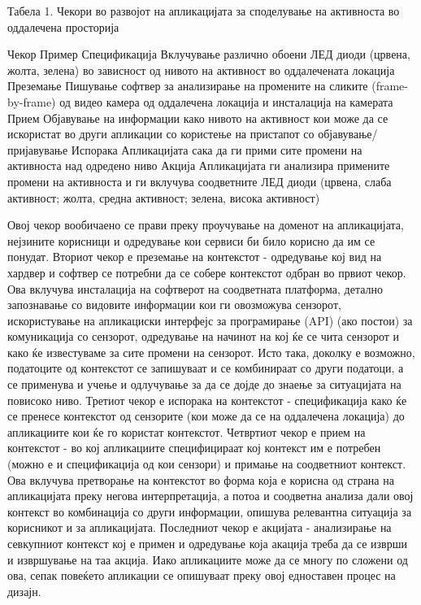 Табела 1. Чекори во развојот на апликацијата за споделување на активноста во
оддалечена просторија 

Чекор   Пример Спецификација Вклучување различно обоени ЛЕД диоди (црвена, жолта, зелена) во зависност од
нивото на активност во оддалечената локација Преземање   Пишување софтвер за
анализирање на промените на сликите (frame-by-frame) од видео камера од
оддалечена локација и инсталација на камерата Прием   Објавување на информации
како нивото на активност кои може да се искористат во други апликации со
користење на пристапот со објавување/пријавување Испорака    Апликацијата сака
да ги прими сите промени на активноста над одредено ниво Акција  Апликацијата ги
анализира примените промени на активноста и ги вклучува соодветните ЛЕД диоди
(црвена, слаба активност; жолта, средна активност; зелена, висока активност)

Овој чекор вообичаено се прави преку проучување на доменот на апликацијата,
нејзините корисници и одредување кои сервиси би било корисно да им се понудат.
Вториот чекор е преземање на контекстот - одредување кој вид на хардвер и
софтвер се потребни да се собере контекстот одбран во првиот чекор. Ова вклучува
инсталација на софтверот на соодветната платформа, детално запознавање со
видовите информации кои ги овозможува сензорот, искористување на апликациски
интерфејс за програмирање (API) (ако постои) за комуникација со сензорот,
одредување на начинот на кој ќе се чита сензорот и како ќе известуваме за сите
промени на сензорот. Исто така, доколку е возможно, податоците од контекстот се
запишуваат и се комбинираат со други податоци, а се применува и учење и
одлучување за да се дојде до знаење за ситуацијата на повисоко ниво. Третиот
чекор е испорака на контекстот - спецификација како ќе се пренесе контекстот од
сензорите (кои може да се на оддалечена локација) до апликациите кои ќе го
користат контекстот. Четвртиот чекор е прием на контекстот - во кој апликациите
специфицираат кој контекст им е потребен (можно е и спецификација од кои
сензори) и примање на соодветниот контекст. Ова вклучува претворање на
контекстот во форма која е корисна од страна на апликацијата преку негова
интерпретација, а потоа и соодветна анализа дали овој контекст во комбинација со
други информации, опишува релевантна ситуација за корисникот и за апликацијата.
Последниот чекор е акцијата - анализирање на севкупниот контекст кој е примен и
одредување која акација треба да се изврши и извршување на таа акција. Иако
апликациите може да се многу по сложени од ова, сепак повеќето апликации се
опишуваат преку овој едноставен процес на дизајн.

